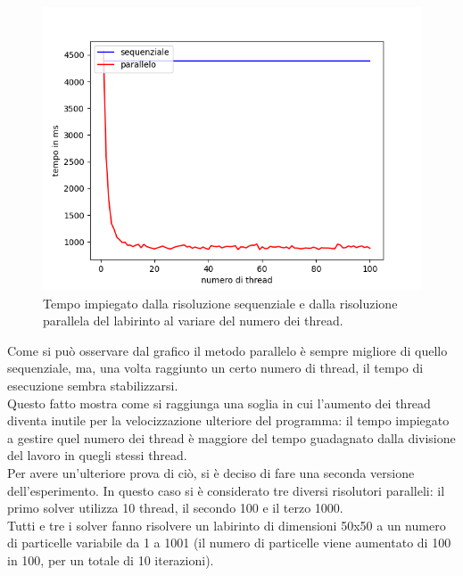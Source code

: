 \documentclass[10pt,twocolumn,letterpaper]{article}
\begin{document}
\begin{figure}[H]
\includegraphics[width=1.1\linewidth]{test/threadsTest/result.png}
\caption{\small Tempo impiegato dalla risoluzione sequenziale e dalla risoluzione parallela del labirinto al variare del numero dei thread.}
\label{t3}
\end{figure}

Come si può osservare dal grafico il metodo parallelo è sempre migliore di quello sequenziale, ma, una volta raggiunto un certo numero di thread, il tempo di esecuzione sembra stabilizzarsi.\\
Questo fatto mostra come si raggiunga una soglia in cui l'aumento dei thread diventa inutile per la velocizzazione ulteriore del programma: il tempo impiegato a gestire quel numero dei thread è maggiore del tempo guadagnato dalla divisione del lavoro in quegli stessi thread.\\
Per avere un'ulteriore prova di ciò, si è deciso di fare una seconda versione dell'esperimento. In questo caso si è considerato tre diversi risolutori paralleli: il primo solver utilizza 10 thread, il secondo 100 e il terzo 1000.\\
Tutti e tre i solver fanno risolvere un labirinto di dimensioni 50x50 a un numero di particelle variabile da 1 a 1001 (il numero di particelle viene aumentato di 100 in 100, per un totale di 10 iterazioni).\\
\end{document}
